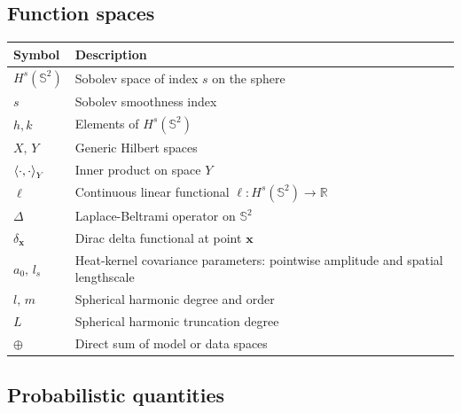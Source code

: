 \vspace{1em}

\subsection*{Function spaces}

\begin{longtable}{@{}lp{10cm}@{}}
    \toprule
    \textbf{Symbol} & \textbf{Description} \\
    \midrule
    $H^s(\mathbb{S}^2)$     & Sobolev space of index $s$ on the sphere \\
    $s$                      & Sobolev smoothness index \\
    $h, k$                   & Elements of $H^s(\mathbb{S}^2)$ \\
    $X,\, Y$                 & Generic Hilbert spaces \\
    $\braket{\cdot,\cdot}_Y$ & Inner product on space $Y$ \\
    $\ell$                   & Continuous linear functional $\ell: H^s(\mathbb{S}^2) \to \mathbb{R}$ \\
    $\Delta$                 & Laplace-Beltrami operator on $\mathbb{S}^2$ \\
    $\delta_{\mathbf{x}}$   & Dirac delta functional at point $\mathbf{x}$ \\
    $a_0,\, l_s$             & Heat-kernel covariance parameters: pointwise amplitude and spatial lengthscale \\
    $l,\, m$                 & Spherical harmonic degree and order \\
    $L$                      & Spherical harmonic truncation degree \\
    $\oplus$                 & Direct sum of model or data spaces \\
    \bottomrule
\end{longtable}
\vspace{1em}
\subsection*{Probabilistic quantities}

